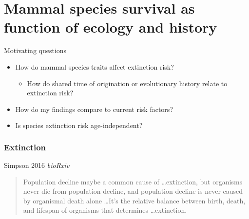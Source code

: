 \documentclass{beamer}
\begin{document}
\section{Mammal species survival as function of ecology and history}


\begin{frame}
  \begin{alertblock}{Motivating questions}
    \begin{itemize}
      \item How do mammal species traits affect extinction risk?
        \begin{itemize}
          \item How do shared time of origination or evolutionary history relate to extinction risk?
        \end{itemize}
      \item How do my findings compare to current risk factors?
      \item Is species extinction risk age-independent?
    \end{itemize}
  \end{alertblock}
\end{frame}

\begin{frame}
  \frametitle{Extinction}
  \begin{block}{Simpson 2016 \em{bioRxiv}}
    \begin{quote}
      Population decline maybe a common cause of \dots extinction, but organisms never die from population decline, and population decline is never caused by organismal death alone \dots It's the relative balance between birth, death, and lifespan of organisms that determines \dots extinction. 
    \end{quote}
  \end{block}
\end{frame}

%
%
\end{document}

